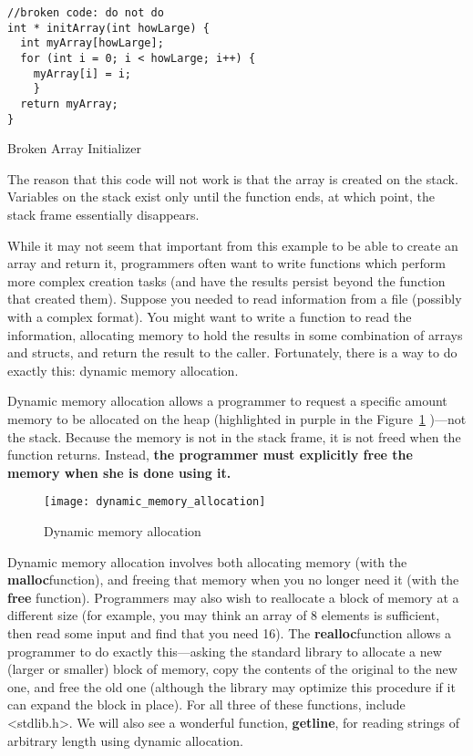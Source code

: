 \documentclass[11pt, a4paper]{article}
\begin{document}
\begin{listing}
\begin{verbatim}
//broken code: do not do
int * initArray(int howLarge) {
  int myArray[howLarge];
  for (int i = 0; i < howLarge; i++) {
    myArray[i] = i;
 	}
  return myArray;
}
\end{verbatim}
\caption{Broken Array Initializer}
\label{lst:broken_array_initializer}
\end{listing}


The reason that this code will not work is that the array is created on the stack. Variables on the stack exist only until the function ends, at which point, the stack frame essentially disappears.

While it may not seem that important from this example to be able to create an array and return it, programmers often want to write functions which perform more complex creation tasks (and have the results persist beyond the function that created them). Suppose you needed to read information from a file (possibly with a complex format). You might want to write a function to read the information, allocating memory to hold the results in some combination of arrays and structs, and return the result to the caller. Fortunately, there is a way to do exactly this: dynamic memory allocation.

Dynamic memory allocation allows a programmer to request a specific amount memory to be allocated on the heap (highlighted in purple in the Figure~\ref{fig:dynamic_memory_allocation} )—not the stack. Because the memory is not in the stack frame, it is not freed when the function returns. Instead, \textbf{the programmer must explicitly free the memory when she is done using it.}


\begin{figure}[htpb]
  \centering
  \texttt{[image: dynamic\_memory\_allocation]}
  \caption{Dynamic memory allocation}
  \label{fig:dynamic_memory_allocation}
\end{figure}


Dynamic memory allocation involves both allocating memory (with the \textbf{malloc}function), and freeing that memory when you no longer need it (with the \textbf{free }function). Programmers may also wish to reallocate a block of memory at a different size (for example, you may think an array of 8 elements is sufficient, then read some input and find that you need 16). The \textbf{realloc}function allows a programmer to do exactly this—asking the standard library to allocate a new (larger or smaller) block of memory, copy the contents of the original to the new one, and free the old one (although the library may optimize this procedure if it can expand the block in place). For all three of these functions, include <stdlib.h>. We will also see a wonderful function, \textbf{getline}, for reading strings of arbitrary length using dynamic allocation.
\end{document}
